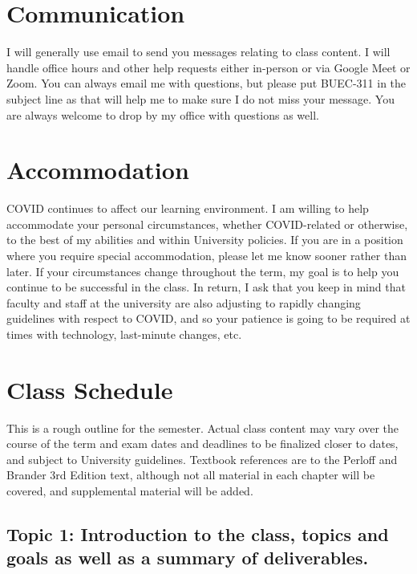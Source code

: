 \documentclass[11pt,]{article}
\begin{document}
\hypertarget{communication}{%
\section{Communication}\label{communication}}

I will generally use email to send you messages relating to class
content. I will handle office hours and other help requests either
in-person or via Google Meet or Zoom. You can always email me with
questions, but please put BUEC-311 in the subject line as that will help
me to make sure I do not miss your message. You are always welcome to
drop by my office with questions as well.

\hypertarget{accommodation}{%
\section{Accommodation}\label{accommodation}}

COVID continues to affect our learning environment. I am willing to help
accommodate your personal circumstances, whether COVID-related or
otherwise, to the best of my abilities and within University policies.
If you are in a position where you require special accommodation, please
let me know sooner rather than later. If your circumstances change
throughout the term, my goal is to help you continue to be successful in
the class. In return, I ask that you keep in mind that faculty and staff
at the university are also adjusting to rapidly changing guidelines with
respect to COVID, and so your patience is going to be required at times
with technology, last-minute changes, etc.

\hypertarget{class-schedule}{%
\section{Class Schedule}\label{class-schedule}}

This is a rough outline for the semester. Actual class content may vary
over the course of the term and exam dates and deadlines to be finalized
closer to dates, and subject to University guidelines. Textbook
references are to the Perloff and Brander 3rd Edition text, although not
all material in each chapter will be covered, and supplemental material
will be added.

\hypertarget{topic-1-introduction-to-the-class-topics-and-goals-as-well-as-a-summary-of-deliverables.}{%
\subsection{Topic 1: Introduction to the class, topics and goals as well
as a summary of
deliverables.}\label{topic-1-introduction-to-the-class-topics-and-goals-as-well-as-a-summary-of-deliverables.}}
\end{document}
